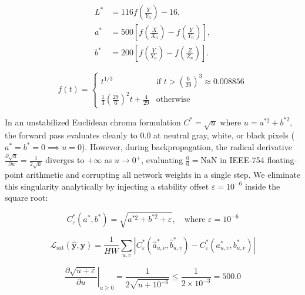 \documentclass[10pt,a4paper,twoside]{article}
\begin{document}
\begin{equation}
    \begin{aligned}
        L^* &= 116f\!\left(\frac{Y}{Y_n}\right)-16,\\
        a^* &= 500\left[f\!\left(\frac{X}{X_n}\right)
        -f\!\left(\frac{Y}{Y_n}\right)\right],\\
        b^* &= 200\left[f\!\left(\frac{Y}{Y_n}\right)
        -f\!\left(\frac{Z}{Z_n}\right)\right].
    \end{aligned}
    \label{eq:lab_coords}
\end{equation}

\begin{equation}
    f(t) = \begin{cases}
        t^{1/3}                                                 & \text{if } t > \left(\frac{6}{29}\right)^3 \approx 0.008856 \\
        \frac{1}{3}\left(\frac{29}{6}\right)^2 t + \frac{4}{29} & \text{otherwise}
    \end{cases}
    \label{eq:lab_transfer}
\end{equation}

In an unstabilized Euclidean chroma formulation $C^* = \sqrt{u}$ where $u = a^{*2} + b^{*2}$, the forward pass evaluates cleanly to $0.0$ at neutral gray, white, or black pixels ($a^* = b^* = 0 \implies u = 0$). However, during backpropagation, the radical derivative $\frac{\partial \sqrt{u}}{\partial u} = \frac{1}{2\sqrt{u}}$ diverges to $+\infty$ as $u \to 0^+$, evaluating $\frac{0}{0} = \mathrm{NaN}$ in IEEE-754 floating-point arithmetic and corrupting all network weights in a single step. We eliminate this singularity analytically by injecting a stability offset $\varepsilon = 10^{-6}$ inside the square root:

\begin{equation}
    C^*_{\varepsilon}(a^*, b^*) = \sqrt{a^{*2} + b^{*2} + \varepsilon}, \quad \text{where } \varepsilon = 10^{-6}
    \label{eq:chroma_mag}
\end{equation}

\begin{equation}
    \mathcal{L}_{\mathrm{sat}}(\hat{\mathbf{y}}, \mathbf{y}) = \frac{1}{HW}\sum_{u,v}\left| C^*_{\varepsilon}(\hat{a}^*_{u,v}, \hat{b}^*_{u,v}) - C^*_{\varepsilon}(a^*_{u,v}, b^*_{u,v}) \right|
    \label{eq:sat_loss}
\end{equation}

\begin{equation}
    \left.\frac{\partial \sqrt{u + \varepsilon}}{\partial u}\right|_{u \ge 0} = \frac{1}{2\sqrt{u + 10^{-6}}} \le \frac{1}{2 \times 10^{-3}} = 500.0
    \label{eq:grad_bound}
\end{equation}
\end{document}
